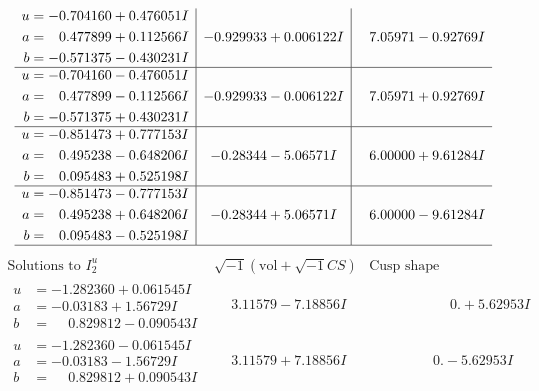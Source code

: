 \documentclass[1p]{elsarticle_modified}
\theoremstyle{definition}
\newcommand{\I}{\sqrt{-1}}
\begin{document}
$$\begin{array}{c|c|c}
\begin{aligned}
u &= -0.704160 + 0.476051 I \\
a &= \phantom{-}0.477899 + 0.112566 I \\
b &= -0.571375 - 0.430231 I\end{aligned}
 & -0.929933 + 0.006122 I & \phantom{-}7.05971 - 0.92769 I \\ \hline\begin{aligned}
u &= -0.704160 - 0.476051 I \\
a &= \phantom{-}0.477899 - 0.112566 I \\
b &= -0.571375 + 0.430231 I\end{aligned}
 & -0.929933 - 0.006122 I & \phantom{-}7.05971 + 0.92769 I \\ \hline\begin{aligned}
u &= -0.851473 + 0.777153 I \\
a &= \phantom{-}0.495238 - 0.648206 I \\
b &= \phantom{-}0.095483 + 0.525198 I\end{aligned}
 & -0.28344 - 5.06571 I & \phantom{-}6.00000 + 9.61284 I \\ \hline\begin{aligned}
u &= -0.851473 - 0.777153 I \\
a &= \phantom{-}0.495238 + 0.648206 I \\
b &= \phantom{-}0.095483 - 0.525198 I\end{aligned}
 & -0.28344 + 5.06571 I & \phantom{-}6.00000 - 9.61284 I\\
 \hline 
 \end{array}$$\newpage$$\begin{array}{c|c|c}  
\text{Solutions to }I^u_{2}& \I (\text{vol} + \sqrt{-1}CS) & \text{Cusp shape}\\
 \hline 
\begin{aligned}
u &= -1.282360 + 0.061545 I \\
a &= -0.03183 + 1.56729 I \\
b &= \phantom{-}0.829812 - 0.090543 I\end{aligned}
 & \phantom{-}3.11579 - 7.18856 I & \phantom{-0.000000 -}0. + 5.62953 I \\ \hline\begin{aligned}
u &= -1.282360 - 0.061545 I \\
a &= -0.03183 - 1.56729 I \\
b &= \phantom{-}0.829812 + 0.090543 I\end{aligned}
 & \phantom{-}3.11579 + 7.18856 I & \phantom{-0.000000 } 0. - 5.62953 I \\ \hline\begin{aligned}

\end{aligned}
\end{array}$$
\end{document}
